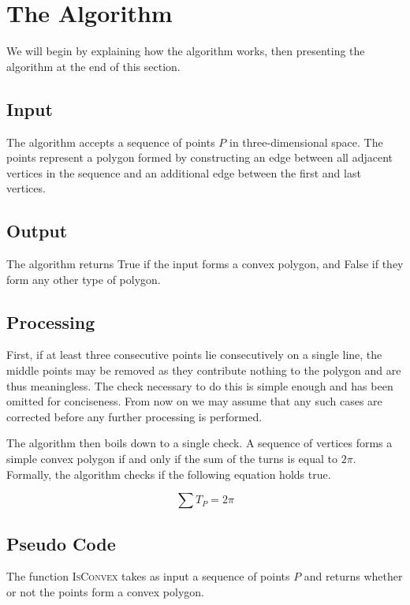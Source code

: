 \documentclass{article}
\begin{document}
\section{The Algorithm}

We will begin by explaining how the algorithm works, then presenting the algorithm at the end of this section.

\subsection{Input}

The algorithm accepts a sequence of points \(P\) in three-dimensional space. The points represent a polygon formed by constructing an edge between all adjacent vertices in the sequence and an additional edge between the first and last vertices.

\subsection{Output}

The algorithm returns True if the input forms a convex polygon, and False if they form any other type of polygon.

\subsection{Processing}

First, if at least three consecutive points lie consecutively on a single line, the middle points may be removed as they contribute nothing to the polygon and are thus meaningless. The check necessary to do this is simple enough and has been omitted for conciseness. From now on we may assume that any such cases are corrected before any further processing is performed.

The algorithm then boils down to a single check. A sequence of vertices forms a simple convex polygon if and only if the sum of the turns is equal to \(2\pi\). Formally, the algorithm checks if the following equation holds true.

\begin{equation*}
	\sum T_P = 2\pi
\end{equation*}

\subsection{Pseudo Code}

The function \textsc{IsConvex} takes as input a sequence of points \(P\) and returns whether or not the points form a convex polygon.
\end{document}
